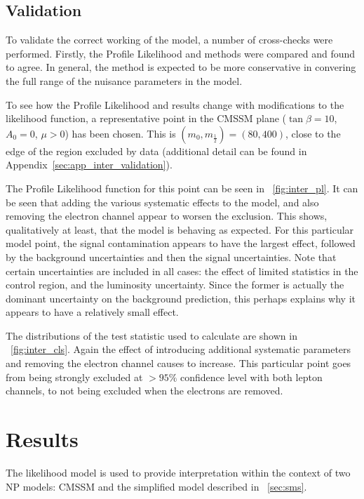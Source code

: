 \subsection{Validation}
\label{sec:inter_validation}
To validate the correct working of the model, a number of cross-checks were
performed. Firstly, the Profile Likelihood and \CLs methods were compared and
found to agree. In general, the \CLs method is expected to be more conservative
in convering the full range of the nuisance parameters in the model.

To see how the Profile Likelihood and \CLs results change with modifications to
the likelihood function, a representative point in the \ac{CMSSM} plane
($\tan\beta=10$, $A_0=0$, $\mu>0$) has been chosen. This is $(m_0,
m_{\frac{1}{2}}) = (80, 400)$, close to the edge of the region excluded by data
(additional detail can be found in Appendix~\ref{sec:app_inter_validation}).

The Profile Likelihood function for this point can be seen in
\fig~\ref{fig:inter_pl}. It can be seen that adding the various systematic
effects to the model, and also removing the electron channel appear to worsen
the exclusion. This shows, qualitatively at least, that the model is behaving as
expected. For this particular model point, the signal contamination appears to
have the largest effect, followed by the background uncertainties and then the
signal uncertainties. Note that certain uncertainties are included in all cases:
the effect of limited statistics in the control region, and the luminosity
uncertainty. Since the former is actually the dominant uncertainty on the
background prediction, this perhaps explains why it appears to have a relatively
small effect.

The distributions of the test statistic used to calculate \CLs are shown in
\fig~\ref{fig:inter_cls}. Again the effect of introducing additional
systematic parameters and removing the electron channel causes \CLs to
increase. This particular point goes from being strongly excluded at $> 95\%$
confidence level with both lepton channels, to not being excluded when the
electrons are removed.

\section{Results}
The likelihood model is used to provide interpretation within the context of two
\ac{NP} models: \ac{CMSSM} and the \Ttwott simplified model described in
\sec~\ref{sec:sms}.

